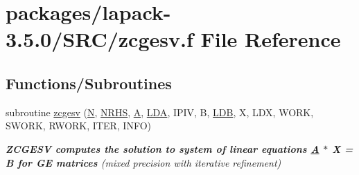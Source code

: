 \hypertarget{zcgesv_8f}{}\section{packages/lapack-\/3.5.0/\+S\+R\+C/zcgesv.f File Reference}
\label{zcgesv_8f}
\subsection*{Functions/\+Subroutines}
\begin{DoxyCompactItemize}
\item 
subroutine \hyperlink{group__complex16GEsolve_ga892cb7992dc737797a8b8043dfc81a48}{zcgesv} (\hyperlink{polmisc_8c_a0240ac851181b84ac374872dc5434ee4}{N}, \hyperlink{example__user_8c_aa0138da002ce2a90360df2f521eb3198}{N\+R\+H\+S}, \hyperlink{classA}{A}, \hyperlink{example__user_8c_ae946da542ce0db94dced19b2ecefd1aa}{L\+D\+A}, I\+P\+I\+V, B, \hyperlink{example__user_8c_a50e90a7104df172b5a89a06c47fcca04}{L\+D\+B}, X, L\+D\+X, W\+O\+R\+K, S\+W\+O\+R\+K, R\+W\+O\+R\+K, I\+T\+E\+R, I\+N\+F\+O)
\begin{DoxyCompactList}\small\item\em {\bfseries  Z\+C\+G\+E\+S\+V computes the solution to system of linear equations \hyperlink{classA}{A} $\ast$ X = B for G\+E matrices} (mixed precision with iterative refinement) \end{DoxyCompactList}\end{DoxyCompactItemize}
